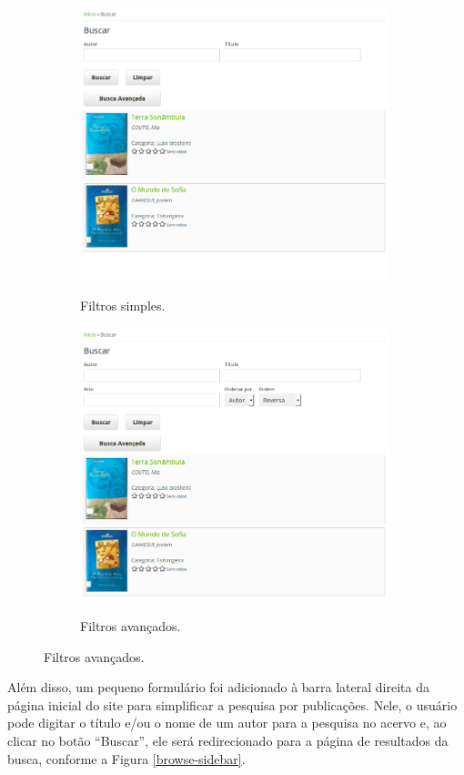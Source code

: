 \documentclass[a4paper]{article}
\begin{document}
\begin{figure}
\caption{Página de busca por publicações}
\begin{subfigure}{.5\textwidth}
  \caption{Filtros simples.}
  \includegraphics[width=90mm]{img/browse-simple.png}
  \label{simple}
\end{subfigure}%
\begin{subfigure}{.5\textwidth}
  \caption{Filtros avançados.}
  \includegraphics[width=90mm]{img/browse-advanced.png}
  \label{advanced}
\end{subfigure}
\label{fig:publication-search}
\end{figure}

Além disso, um pequeno formulário foi adicionado à barra lateral direita da página inicial do site para simplificar a pesquisa por publicações. Nele, o usuário pode digitar o título e/ou o nome de um autor para a pesquisa no acervo e, ao clicar no botão “Buscar”, ele será redirecionado para a página de resultados da busca, conforme a Figura \ref{browse-sidebar}.
\end{document}
